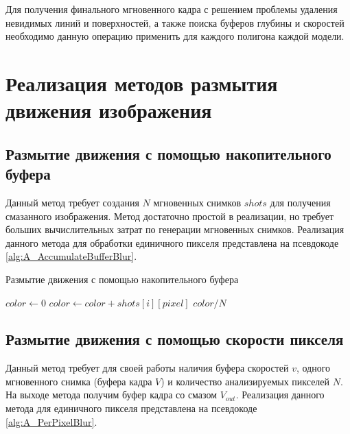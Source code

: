 Для получения финального мгновенного кадра с решением проблемы удаления невидимых линий и поверхностей, а также поиска буферов глубины и скоростей необходимо данную операцию применить для каждого полигона каждой модели.

\section{Реализация методов размытия движения изображения}

\subsection{Размытие движения с помощью накопительного буфера}

Данный метод требует создания $N$ мгновенных снимков $shots$ для получения смазанного изображения. Метод достаточно простой в реализации, но требует больших вычислительных затрат по генерации мгновенных снимков. Реализация данного метода для обработки единичного пикселя представлена на псевдокоде \ref{alg:A_AccumulateBufferBlur}.


\begin{breakablealgorithm}
    \caption{Размытие движения с помощью накопительного буфера} \label{alg:A_AccumulateBufferBlur}
    \begin{algorithmic}[1]
        \State $color \leftarrow 0$
        \ForAll{$i \in [0; N)$}
            \State $color \leftarrow color + shots[i][pixel]$
        \EndFor
        \State \Return $color / N$
        \EndFunction
\end{algorithmic}
\end{breakablealgorithm}

\subsection{Размытие движения с помощью скорости пикселя}

Данный метод требует для своей работы наличия буфера скоростей $v$, одного мгновенного снимка (буфера кадра $V$) и количество анализируемых пикселей $N$.  На выходе метода получим буфер кадра со смазом $V_{out}$. Реализация данного метода для единичного пикселя представлена на псевдокоде \ref{alg:A_PerPixelBlur}.

